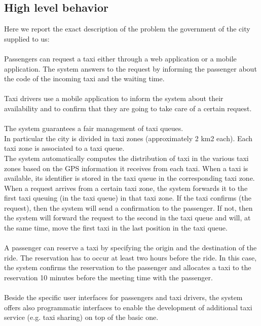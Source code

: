 \subsection{High level behavior}
Here we report the exact description of the problem the government of the city supplied to us: \\ \\ 
Passengers can request a taxi either through a web application or a mobile application.
The system answers to the request by informing the passenger about the code of the incoming taxi and the waiting time.\\ \\
Taxi drivers use a mobile application to inform the system about their availability and to confirm that they are going to take care of a certain request. \\ \\  
The system guarantees a fair management of taxi queues. \\
In particular the city is divided in taxi zones (approximately 2 km2 each). Each taxi zone is associated to a taxi queue.\\
The system automatically computes the distribution of taxi in the various taxi zones based on the GPS information it receives from each taxi. When a taxi is available, its identifier is stored in the taxi queue in the corresponding taxi zone. When a request arrives from a certain taxi zone, the system forwards it to the first taxi queuing (in the taxi queue) in that taxi zone. If the taxi confirms (the request), then the system will send a confirmation to the passenger. If not, then the system will forward the request to the second in the taxi queue and will, at the same time, move the first taxi in the last position in the taxi queue.\\ \\
A passenger can reserve a taxi by specifying the origin and the destination of the ride. The reservation has to occur at least two hours before the ride. In this case, the system confirms the reservation to the passenger and allocates a taxi to the reservation 10 minutes before the meeting time with the passenger. \\ \\
Beside the specific user interfaces for passengers and taxi drivers, the system offers also programmatic interfaces to enable the development of additional taxi service (e.g. taxi sharing) on top of the basic one. 


